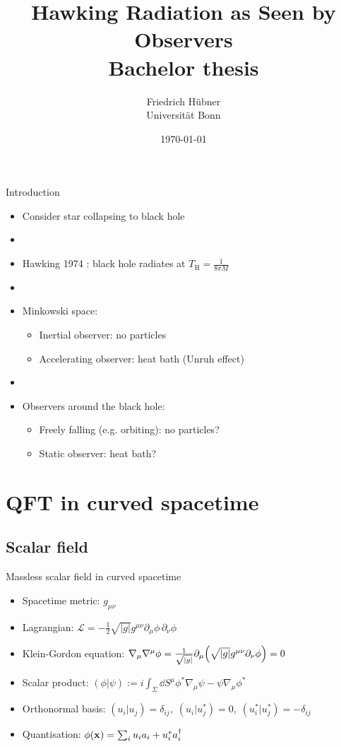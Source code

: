 \documentclass{beamer}
\title[Hawking Radiation for Observers]{\vspace{1cm}Hawking Radiation as Seen by Observers\\\small{Bachelor thesis}}
\author[Friedrich Hübner]{Friedrich Hübner\\Universität Bonn}
\date{\today}
\newcommand{\ind}[1]{_\mathrm{#1}}
\begin{document}
\beamertemplatenavigationsymbolsempty
\titlepage

\begin{frame}{Introduction}
\begin{itemize}
	\item Consider star collapsing to black hole
	\item[]
	\item Hawking 1974 \cite{hawking}: black hole radiates at \(T\ind{H} = \frac{1}{8\pi M}\)
	\item[]
	\item Minkowski space:
		\begin{itemize}
			\item Inertial observer: no particles
			\item Accelerating observer: heat bath (Unruh effect)
		\end{itemize}		 
	\item[]
	\item Observers around the black hole:
		\begin{itemize}
			\item Freely falling (e.g. orbiting): no particles?
			\item Static observer: heat bath?
		\end{itemize}
\end{itemize}
\end{frame}

\frame{\setcounter{tocdepth}{1}\hspace{1cm}\tableofcontents}

\section{QFT in curved spacetime}
\subsection{Scalar field}
\begin{frame}{Massless scalar field in curved spacetime}
\begin{itemize}
	\item Spacetime metric: \(g_{\mu\nu}\)
	\item Lagrangian: \(\mathcal{L} = -\frac{1}{2}\sqrt{|g|} g^{\mu\nu} \partial_\mu \phi\,\partial_\nu \phi\)
	\item Klein-Gordon equation: \(\nabla_\mu\nabla^\mu \phi = \frac{1}{\sqrt{|g|}}\partial_\mu \qty(\sqrt{|g|} g^{\mu\nu} \partial_\nu \phi) = 0\)
	\item Scalar product: \((\phi|\psi) := i \int_{\Sigma}\dd{S^\mu} \phi^*\nabla_\mu \psi - \psi\nabla_\mu \phi^*\)
	\item Orthonormal basis: \((u_i|u_j) = \delta_{ij},\;(u_i|u_j^*) = 0,\;(u_i^*|u_j^*) = -\delta_{ij}\)
	\item Quantisation: \(\phi(\vb{x}) = \sum_i u_i a_i + u_i^*a_i^\dagger\)
\end{itemize}
\end{frame}
\end{document}
